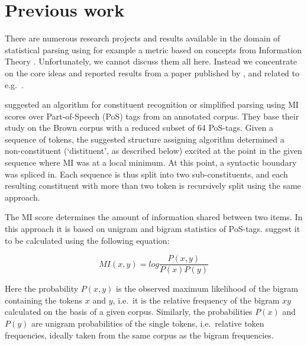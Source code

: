 \documentclass[11pt,a4paper,english]{article}
\begin{document}
\section{Previous work}\label{Sec:MagermanMI}

There are numerous research projects and results available in the domain of statistical parsing using for example a metric based on concepts from Information Theory \citep{Shannon:1948}. Unfortunately, we cannot discuss them all here. Instead we concentrate on the core ideas and reported results from a paper published by \cite{Magerman:Marcus:1990}, and related to e.g.\ \cite{Church:1988}.

\cite{Magerman:Marcus:1990} suggested an algorithm for constituent recognition or simplified parsing using MI scores over Part-of-Speech (PoS) tags from an annotated corpus. They base their study on the Brown corpus \citep{Francis:Kucera:1982} with a reduced subset of 64 PoS-tags. Given a sequence of tokens, the suggested structure assigning algorithm determined a non-constituent (`distituent', as described below) excited at the point in the given sequence where MI was at a local minimum. At this point, a syntactic boundary was spliced in. Each sequence is thus split into two sub-constituents, and each resulting constituent with more than two token is recursively split using the same approach.

The MI score determines the amount of information shared between two items. In this approach it is based on unigram and bigram statistics of PoS-tags. \cite{Magerman:Marcus:1990} suggest it to be calculated using the following equation:

\begin{equation}
MI(x,y)=log\frac{P(x,y)}{P(x)P(y)}
\end{equation}

Here the probability $P(x,y)$ is the observed maximum likelihood of the bigram containing the tokens $x$ and $y$, i.e.\ it is the relative frequency of the bigram $xy$ calculated on the basis of a given corpus. Similarly, the probabilities $P(x)$ and $P(y)$ are unigram probabilities of the single tokens, i.e.\ relative token frequencies, ideally taken from the same corpus as the bigram frequencies.
\end{document}
